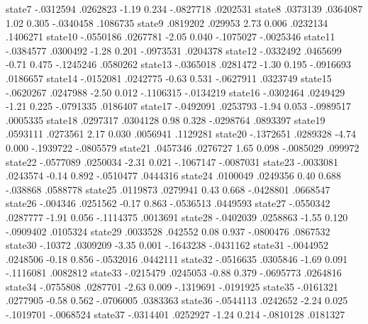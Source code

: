       state7 {\VBAR}  -.0312594   .0262823    -1.19   0.234    -.0827718    .0202531
      state8 {\VBAR}   .0373139   .0364087     1.02   0.305    -.0340458    .1086735
      state9 {\VBAR}   .0819202    .029953     2.73   0.006     .0232134    .1406271
     state10 {\VBAR}  -.0550186   .0267781    -2.05   0.040    -.1075027   -.0025346
     state11 {\VBAR}  -.0384577   .0300492    -1.28   0.201    -.0973531    .0204378
     state12 {\VBAR}  -.0332492   .0465699    -0.71   0.475    -.1245246    .0580262
     state13 {\VBAR}  -.0365018   .0281472    -1.30   0.195    -.0916693    .0186657
     state14 {\VBAR}  -.0152081   .0242775    -0.63   0.531    -.0627911    .0323749
     state15 {\VBAR}  -.0620267   .0247988    -2.50   0.012    -.1106315   -.0134219
     state16 {\VBAR}  -.0302464   .0249429    -1.21   0.225    -.0791335    .0186407
     state17 {\VBAR}  -.0492091   .0253793    -1.94   0.053    -.0989517    .0005335
     state18 {\VBAR}   .0297317   .0304128     0.98   0.328    -.0298764    .0893397
     state19 {\VBAR}   .0593111   .0273561     2.17   0.030     .0056941    .1129281
     state20 {\VBAR}  -.1372651   .0289328    -4.74   0.000    -.1939722   -.0805579
     state21 {\VBAR}   .0457346   .0276727     1.65   0.098    -.0085029     .099972
     state22 {\VBAR}  -.0577089   .0250034    -2.31   0.021    -.1067147   -.0087031
     state23 {\VBAR}  -.0033081   .0243574    -0.14   0.892    -.0510477    .0444316
     state24 {\VBAR}   .0100049   .0249356     0.40   0.688     -.038868    .0588778
     state25 {\VBAR}   .0119873   .0279941     0.43   0.668    -.0428801    .0668547
     state26 {\VBAR}   -.004346   .0251562    -0.17   0.863    -.0536513    .0449593
     state27 {\VBAR}  -.0550342   .0287777    -1.91   0.056    -.1114375    .0013691
     state28 {\VBAR}  -.0402039   .0258863    -1.55   0.120    -.0909402    .0105324
     state29 {\VBAR}   .0033528    .042552     0.08   0.937    -.0800476    .0867532
     state30 {\VBAR}    -.10372   .0309209    -3.35   0.001    -.1643238   -.0431162
     state31 {\VBAR}  -.0044952   .0248506    -0.18   0.856    -.0532016    .0442111
     state32 {\VBAR}  -.0516635   .0305846    -1.69   0.091    -.1116081    .0082812
     state33 {\VBAR}  -.0215479   .0245053    -0.88   0.379    -.0695773    .0264816
     state34 {\VBAR}  -.0755808   .0287701    -2.63   0.009    -.1319691   -.0191925
     state35 {\VBAR}  -.0161321   .0277905    -0.58   0.562    -.0706005    .0383363
     state36 {\VBAR}  -.0544113   .0242652    -2.24   0.025    -.1019701   -.0068524
     state37 {\VBAR}  -.0314401   .0252927    -1.24   0.214    -.0810128    .0181327
